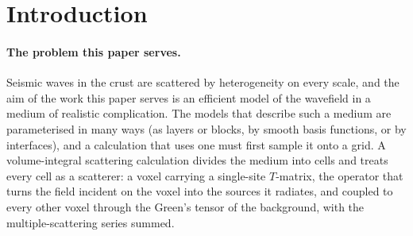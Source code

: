 \documentclass[11pt,a4paper]{article}
\newcommand{\bk}{\mathbf{k}}
\begin{document}
\begin{abstract}
unchanged. That constant is not independent of the frequency: a cell holds
the product of medium and wave and loses $\nabla^{p+1}(fw)=w(\nabla+\mathrm{i}\bk)^{p+1}f$, so the wave's
variation enters beside the medium's, in powers of $kL$ with $L$ the length over which the medium varies. On that sphere, given the same cell mean of the medium, the Galerkin cell of
degree one needs $7.5$ to $25$ times fewer unknowns than the classical point-matching cell, whose single site
we evaluate exactly at every frequency, a factor that grows as the three-quarters power of the accuracy asked
because the two differ in order; with the medium sampled at the cell centres, where on smooth bodies the
sampling error largely cancels the point cell's own, the two need about the same down to a crossover error.
Against point matching carried to the same order by the gradients of the field it needs about $1.4$ times
fewer unknowns. At equal degree the point cell is the more accurate: the Galerkin cell's gain is not
accuracy cell for cell but cheap order. Every result is derived symbolically and checked against an independent
implementation or an exact solution.
\end{abstract}

\section{Introduction}\label{sec:intro}

\paragraph{The problem this paper serves.} Seismic waves in the crust are scattered by heterogeneity
on every scale, and the aim of the work this paper serves is an efficient model of the wavefield in a
medium of realistic complication. The models that describe such a medium are parameterised in many
ways (as layers or blocks, by smooth basis functions, or by interfaces), and a calculation that uses
one must first sample it onto a grid. A volume-integral scattering calculation divides the medium into
cells and treats every cell as a scatterer: a voxel carrying a single-site $T$-matrix, the operator
that turns the field incident on the voxel into the sources it radiates, and coupled to every other
voxel through the Green's tensor of the background, with the multiple-scattering series summed.
\end{document}
